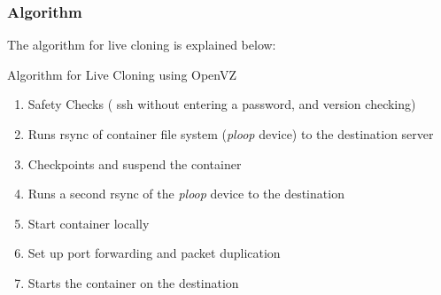 

\subsubsection{Algorithm}
\fi


\iffalse
The algorithm for live cloning is explained below: 

\begin{algorithm}[ht]
\begin{algorithmic}
   \caption{Algorithm for Live Cloning using OpenVZ 
   \label{algCloning}}
 \begin{enumerate}
   \item Safety Checks ( ssh without entering a password, and version checking) 
   \item Runs rsync of container file system (\textit{ploop} device) to the destination server  
   \item Checkpoints and suspend the container 
   \item Runs a second rsync of the \textit{ploop} device to the destination  
   \item Start container locally 
   \item Set up port forwarding and packet duplication
   \item Starts the container on the destination 
  \end{enumerate}
\end{algorithmic}
\end{algorithm}

